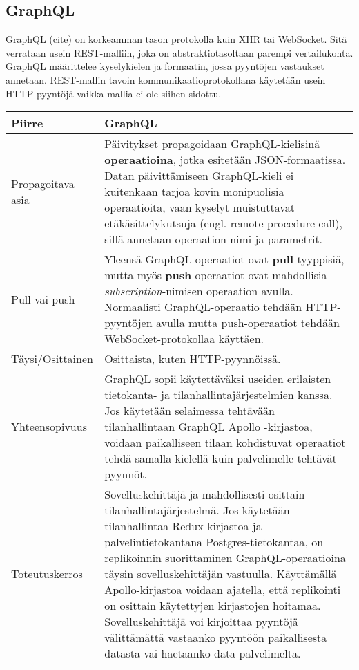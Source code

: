 \documentclass[finnish,twoside,censored,csm,sw-track-2018]{HYthesisML}
\begin{document}
\subsection{GraphQL}

GraphQL (cite) on korkeamman tason protokolla kuin XHR tai WebSocket. Sitä verrataan usein REST-malliin, joka on abstraktiotasoltaan parempi vertailukohta. GraphQL määrittelee kyselykielen ja formaatin, jossa pyyntöjen vastaukset annetaan. REST-mallin tavoin kommunikaatioprotokollana käytetään usein HTTP-pyyntöjä vaikka mallia ei ole siihen sidottu.

\begin{center}
\begin{tabular}{ | m{3.3cm} | m{11.7cm} | }
 \hline
 \textbf{Piirre} & \textbf{GraphQL}\\ 
 \hline
 Propagoitava asia & Päivitykset propagoidaan GraphQL-kielisinä \textbf{operaatioina}, jotka esitetään JSON-formaatissa. Datan päivittämiseen GraphQL-kieli ei kuitenkaan tarjoa kovin monipuolisia operaatioita, vaan kyselyt muistuttavat etäkäsittelykutsuja (engl. remote procedure call), sillä annetaan operaation nimi ja parametrit. \\
 \hline
 Pull vai push & Yleensä GraphQL-operaatiot ovat \textbf{pull}-tyyppisiä, mutta myös \textbf{push}-operaatiot ovat mahdollisia \textit{subscription}-nimisen operaation avulla. Normaalisti GraphQL-operaatio tehdään HTTP-pyyntöjen avulla mutta push-operaatiot tehdään WebSocket-protokollaa käyttäen. \\
 \hline
 Täysi/Osittainen & Osittaista, kuten HTTP-pyynnöissä.\\
 \hline
 Yhteensopivuus & GraphQL sopii käytettäväksi useiden erilaisten tietokanta- ja tilanhallintajärjestelmien kanssa. Jos käytetään selaimessa tehtävään tilanhallintaan GraphQL Apollo -kirjastoa, voidaan paikalliseen tilaan kohdistuvat operaatiot tehdä samalla kielellä kuin palvelimelle tehtävät pyynnöt. \\
 \hline
 Toteutuskerros & Sovelluskehittäjä ja mahdollisesti osittain tilanhallintajärjestelmä. Jos käytetään tilanhallintaa Redux-kirjastoa ja palvelintietokantana Postgres-tietokantaa, on replikoinnin suorittaminen GraphQL-operaatioina täysin sovelluskehittäjän vastuulla. Käyttämällä Apollo-kirjastoa voidaan ajatella, että replikointi on osittain käytettyjen kirjastojen hoitamaa. Sovelluskehittäjä voi kirjoittaa pyyntöjä välittämättä vastaanko pyyntöön paikallisesta datasta vai haetaanko data palvelimelta. \\
 \hline
\end{tabular}
\end{center}
\end{document}
